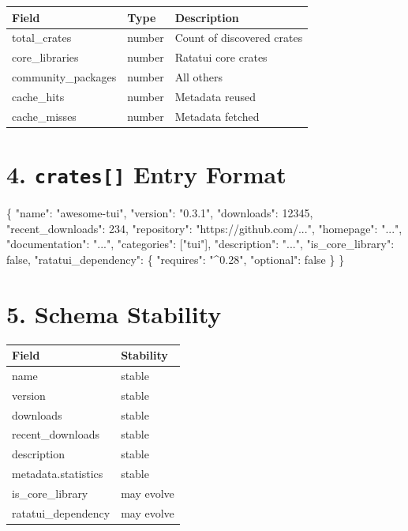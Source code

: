 \documentclass[
  letterpaper,
  DIV=11,
  numbers=noendperiod]{scrreprt}
\newenvironment{Shaded}{\begin{snugshade}}{\end{snugshade}}
\newcommand{\NormalTok}[1]{\textcolor[rgb]{0.00,0.23,0.31}{#1}}
\begin{document}
\begin{longtable}[]{@{}lll@{}}
\toprule\noalign{}
Field & Type & Description \\
\midrule\noalign{}
\endhead
\bottomrule\noalign{}
\endlastfoot
total\_crates & number & Count of discovered crates \\
core\_libraries & number & Ratatui core crates \\
community\_packages & number & All others \\
cache\_hits & number & Metadata reused \\
cache\_misses & number & Metadata fetched \\
\end{longtable}

\chapter{\texorpdfstring{4. \texttt{crates{[}{]}} Entry
Format}{4. crates{[}{]} Entry Format}}\label{crates-entry-format}

\begin{Shaded}
\begin{Highlighting}[]
\NormalTok{\{}
\NormalTok{  "name": "awesome{-}tui",}
\NormalTok{  "version": "0.3.1",}
\NormalTok{  "downloads": 12345,}
\NormalTok{  "recent\_downloads": 234,}
\NormalTok{  "repository": "https://github.com/...",}
\NormalTok{  "homepage": "...",}
\NormalTok{  "documentation": "...",}
\NormalTok{  "categories": ["tui"],}
\NormalTok{  "description": "...",}
\NormalTok{  "is\_core\_library": false,}
\NormalTok{  "ratatui\_dependency": \{}
\NormalTok{    "requires": "\^{}0.28",}
\NormalTok{    "optional": false}
\NormalTok{  \}}
\NormalTok{\}}
\end{Highlighting}
\end{Shaded}

\chapter{5. Schema Stability}\label{schema-stability}

\begin{longtable}[]{@{}ll@{}}
\toprule\noalign{}
Field & Stability \\
\midrule\noalign{}
\endhead
\bottomrule\noalign{}
\endlastfoot
name & stable \\
version & stable \\
downloads & stable \\
recent\_downloads & stable \\
description & stable \\
metadata.statistics & stable \\
is\_core\_library & may evolve \\
ratatui\_dependency & may evolve \\
\end{longtable}
\end{document}
